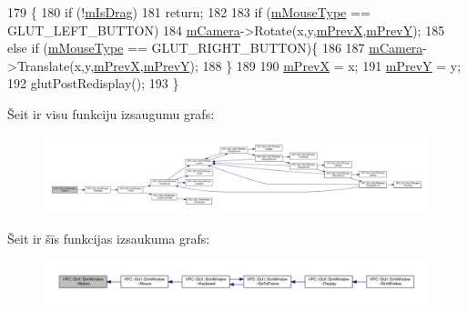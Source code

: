 \begin{DoxyCode}
179 \{
180     \textcolor{keywordflow}{if} (!\hyperlink{class_v_p_c_1_1_g_u_i_1_1_sim_window_a1cc866f5524184bbd8e1a2e061b3fe7c}{mIsDrag})
181         \textcolor{keywordflow}{return};
182 
183     \textcolor{keywordflow}{if} (\hyperlink{class_v_p_c_1_1_g_u_i_1_1_g_l_u_t_window_abcb6dd2e6da3ff86b7d485fc439d6851}{mMouseType} == GLUT\_LEFT\_BUTTON)
184         \hyperlink{class_v_p_c_1_1_g_u_i_1_1_g_l_u_t_window_a188317ab66f82a4c1752797c8f77cc30}{mCamera}->Rotate(x,y,\hyperlink{class_v_p_c_1_1_g_u_i_1_1_g_l_u_t_window_afb53d32a8f4b83476cd57f7b0bdc1b1e}{mPrevX},\hyperlink{class_v_p_c_1_1_g_u_i_1_1_g_l_u_t_window_a11ba670d3ec0ac9ae16f276469dcbbe8}{mPrevY});
185     \textcolor{keywordflow}{else} \textcolor{keywordflow}{if} (\hyperlink{class_v_p_c_1_1_g_u_i_1_1_g_l_u_t_window_abcb6dd2e6da3ff86b7d485fc439d6851}{mMouseType} == GLUT\_RIGHT\_BUTTON)\{
186         
187         \hyperlink{class_v_p_c_1_1_g_u_i_1_1_g_l_u_t_window_a188317ab66f82a4c1752797c8f77cc30}{mCamera}->Translate(x,y,\hyperlink{class_v_p_c_1_1_g_u_i_1_1_g_l_u_t_window_afb53d32a8f4b83476cd57f7b0bdc1b1e}{mPrevX},\hyperlink{class_v_p_c_1_1_g_u_i_1_1_g_l_u_t_window_a11ba670d3ec0ac9ae16f276469dcbbe8}{mPrevY});
188     \}
189 
190     \hyperlink{class_v_p_c_1_1_g_u_i_1_1_g_l_u_t_window_afb53d32a8f4b83476cd57f7b0bdc1b1e}{mPrevX} = x;
191     \hyperlink{class_v_p_c_1_1_g_u_i_1_1_g_l_u_t_window_a11ba670d3ec0ac9ae16f276469dcbbe8}{mPrevY} = y;
192     glutPostRedisplay();
193 \}
\end{DoxyCode}


Šeit ir visu funkciju izsaugumu grafs\+:
\nopagebreak
\begin{figure}[H]
\begin{center}
\leavevmode
\includegraphics[width=350pt]{class_v_p_c_1_1_g_u_i_1_1_sim_window_aba3a57913fd25280353abe94a64539fc_cgraph}
\end{center}
\end{figure}




Šeit ir šīs funkcijas izsaukuma grafs\+:
\nopagebreak
\begin{figure}[H]
\begin{center}
\leavevmode
\includegraphics[width=350pt]{class_v_p_c_1_1_g_u_i_1_1_sim_window_aba3a57913fd25280353abe94a64539fc_icgraph}
\end{center}
\end{figure}


